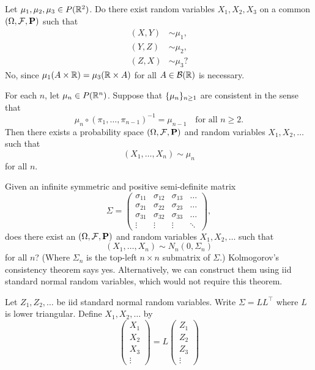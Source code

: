 Let $\mu_1, \mu_2, \mu_3 \in P(\mathbb{R}^2)$.
Do there exist random variables $X_1, X_2, X_3$ on a common
$(\Omega, \mathcal F, \operatorname{\mathbf P})$ such that \begin{align*}
    (X, Y) &\sim \mu_1, \\
    (Y, Z) &\sim \mu_2, \\
    (Z, X) &\sim \mu_3?
\end{align*}
No, since $\mu_1(A \times \mathbb{R}) = \mu_3(\mathbb{R} \times A)$ for all $A \in \mathcal B(\mathbb{R})$
is necessary.

\begin{fact*} \label{thm:kct}
    For each $n$, let $\mu_n \in P(\mathbb{R}^n)$.
    Suppose that $\{\mu_n\}_{n \ge 1}$ are consistent in the sense that
    \[
        \mu_n \circ (\pi_1, \dots, \pi_{n-1})^{-1} = \mu_{n-1}
        \quad \text{for all } n \ge 2.
    \] Then there exists a probability space $(\Omega, \mathcal F, \operatorname{\mathbf P})$ and
    random variables $X_1, X_2, \dots$ such that \[
        (X_1, \dots, X_n) \sim \mu_n
    \] for all $n$.
\end{fact*}

\begin{example}
    Given an infinite symmetric and positive semi-definite matrix \[
        \Sigma = \begin{pmatrix}
            \sigma_{11} & \sigma_{12} & \sigma_{13} & \dots \\
            \sigma_{21} & \sigma_{22} & \sigma_{23} & \dots \\
            \sigma_{31} & \sigma_{32} & \sigma_{33} & \dots \\
            \vdots & \vdots & \vdots & \ddots
        \end{pmatrix},
    \] does there exist an $(\Omega, \mathcal F, \operatorname{\mathbf P})$ and random variables
    $X_1, X_2, \dots$ such that \[
        (X_1, \dots, X_n) \sim N_n(0, \Sigma_n)
    \] for all $n$? (Where $\Sigma_n$ is the top-left $n \times n$ submatrix
    of $\Sigma$.)
    Kolmogorov's consistency theorem says yes.
    Alternatively, we can construct them using iid standard normal random
    variables, which would not require this theorem.

    Let $Z_1, Z_2, \dots$ be iid standard normal random variables.
    Write $\Sigma = L L^\top$ where $L$ is lower triangular.
    Define $X_1, X_2, \dots$ by \[
        \begin{pmatrix}
            X_1 \\
            X_2 \\
            X_3 \\
            \vdots
        \end{pmatrix} = L \begin{pmatrix}
            Z_1 \\
            Z_2 \\
            Z_3 \\
            \vdots
        \end{pmatrix}
    \]
\end{example}
